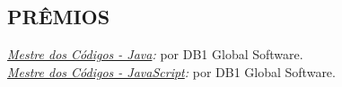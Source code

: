 \documentclass[line,margin]{res}
\begin{document}
\begin{resume}
\section{PRÊMIOS}             
  {\sl \href{https://mestredoscodigos.com.br/primeira-entrega-dos-pins-do-mestre-dos-codigos}{Mestre dos C\'odigos - Java}:} por DB1 Global Software.\\
  {\sl \href{https://mestredoscodigos.com.br/primeira-entrega-dos-pins-do-mestre-dos-codigos}{Mestre dos C\'odigos - JavaScript}:} por DB1 Global Software.\\
 

\end{resume}
\end{document}
